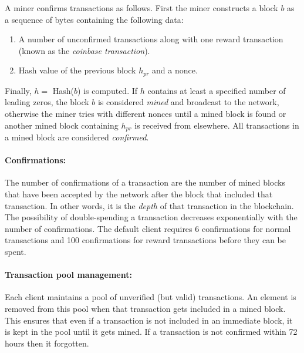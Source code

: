 \documentclass[]{report}   %
\begin{document}
A miner confirms transactions as follows. First the miner constructs a block $b$ as a sequence of bytes containing the following data:
\begin{enumerate}
	\item A number of unconfirmed transactions along with one reward transaction %
	(known as the \emph{coinbase transaction}).
	\item Hash value of the previous block $h_{pr}$  and a nonce. %
\end{enumerate}

 Finally, $h =$ Hash($b$) is computed. If $h$ contains at least a specified number of leading zeros, the block $b$ is considered {\em mined} and broadcast to the network, otherwise the miner tries with different nonces until a mined block is found or another mined block containing $h_{pr}$ is received from elsewhere. All transactions in a mined block are considered {\em confirmed}.

\paragraph{Confirmations:} The number of confirmations of a transaction are the number of mined blocks that have been accepted by the network after the block that included that transaction. In other words, it is the {\em depth} of that transaction in the blockchain. The possibility of double-spending a transaction decreases exponentially with the number of confirmations. The default client requires 6 confirmations for normal transactions and 100 confirmations for reward transactions before they can be spent.  

\paragraph{Transaction pool management:} Each client maintains a pool of unverified (but valid) transactions. An element is removed from this pool when that transaction gets included in a mined block. This ensures that even if a transaction is not included in an immediate block, it is kept in the pool until it gets mined. If a transaction is not confirmed within 72 hours then it forgotten. 
\end{document}
